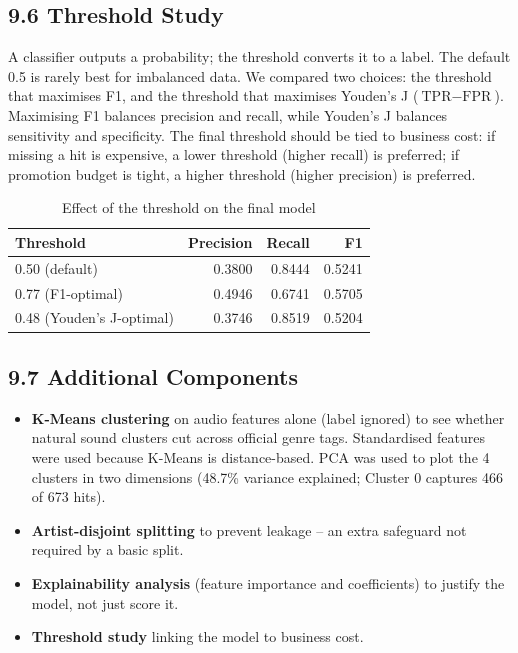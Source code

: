 \documentclass[11pt,a4paper]{article}
\begin{document}
\subsection*{9.6 Threshold Study}
A classifier outputs a probability; the threshold converts it to a label. The default 0.5 is rarely best for imbalanced data. We compared two choices: the threshold that maximises F1, and the threshold that maximises Youden's J ($\text{TPR} - \text{FPR}$). Maximising F1 balances precision and recall, while Youden's J balances sensitivity and specificity. The final threshold should be tied to business cost: if missing a hit is expensive, a lower threshold (higher recall) is preferred; if promotion budget is tight, a higher threshold (higher precision) is preferred.

\begin{table}[H]
\centering
\caption{Effect of the threshold on the final model}
\begin{tabular}{lrrr}
\toprule
\textbf{Threshold} & \textbf{Precision} & \textbf{Recall} & \textbf{F1} \\
\midrule
0.50 (default) & 0.3800 & 0.8444 & 0.5241 \\
0.77 (F1-optimal) & 0.4946 & 0.6741 & 0.5705 \\
0.48 (Youden's J-optimal) & 0.3746 & 0.8519 & 0.5204 \\
\bottomrule
\end{tabular}
\end{table}

\subsection*{9.7 Additional Components}
\begin{itemize}
  \item \textbf{K-Means clustering} on audio features alone (label ignored) to see whether natural sound clusters cut across official genre tags. Standardised features were used because K-Means is distance-based. PCA was used to plot the 4 clusters in two dimensions (48.7\% variance explained; Cluster 0 captures 466 of 673 hits).
  \item \textbf{Artist-disjoint splitting} to prevent leakage -- an extra safeguard not required by a basic split.
  \item \textbf{Explainability analysis} (feature importance and coefficients) to justify the model, not just score it.
  \item \textbf{Threshold study} linking the model to business cost.
\end{itemize}
\end{document}
